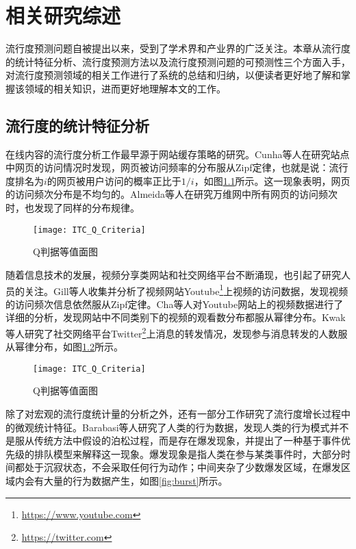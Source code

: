 
\chapter{相关研究综述}
\label{chap:relatedwork}
流行度预测问题自被提出以来，受到了学术界和产业界的广泛关注。本章从流行度的统计特征分析、流行度预测方法以及流行度预测问题的可预测性三个方面入手，对流行度预测领域的相关工作进行了系统的总结和归纳，以便读者更好地了解和掌握该领域的相关知识，进而更好地理解本文的工作。

\section{流行度的统计特征分析}
在线内容的流行度分析工作最早源于网站缓存策略的研究。Cunha等人\citep{cunha1995characteristics}在研究站点中网页的访问情况时发现，网页被访问频率的分布服从Zipf定律\citep{zipf2016human}，也就是说：流行度排名为$i$的网页被用户访问的概率正比于$1/i$，如图\ref{fig:pageDist}所示。这一现象表明，网页的访问频次分布是不均匀的。Almeida等人\citep{almeida1996characterizing}在研究万维网中所有网页的访问频次时，也发现了同样的分布规律。
\begin{figure}[!htbp]
  \centering
  \texttt{[image: ITC\_Q\_Criteria]}
  \caption{Q判据等值面图}
  \label{fig:pageDist}
\end{figure}

随着信息技术的发展，视频分享类网站和社交网络平台不断涌现，也引起了研究人员的关注。Gill等人\citep{gill2007youtube}收集并分析了视频网站Youtube\footnote{\url{https://www.youtube.com}}上视频的访问数据，发现视频的访问频次信息依然服从Zipf定律。Cha等人\citep{cha2009analyzing}对Youtube网站上的视频数据进行了详细的分析，发现网站中不同类别下的视频的观看数分布都服从幂律分布。Kwak等人\citep{kwak2010twitter}研究了社交网络平台Twitter\footnote{\url{https://twitter.com}}上消息的转发情况，发现参与消息转发的人数服从幂律分布，如图\ref{fig:tweetDist}所示。
\begin{figure}[!htbp]
  \centering
  \texttt{[image: ITC\_Q\_Criteria]}
  \caption{Q判据等值面图}
  \label{fig:tweetDist}
\end{figure}

除了对宏观的流行度统计量的分析之外，还有一部分工作研究了流行度增长过程中的微观统计特征。Barabasi等人\citep{barabasi05}研究了人类的行为数据，发现人类的行为模式并不是服从传统方法中假设的泊松过程，而是存在爆发现象，并提出了一种基于事件优先级的排队模型来解释这一现象。爆发现象是指人类在参与某类事件时，大部分时间都处于沉寂状态，不会采取任何行为动作；中间夹杂了少数爆发区域，在爆发区域内会有大量的行为数据产生，如图\ref{fig:burst}所示。

